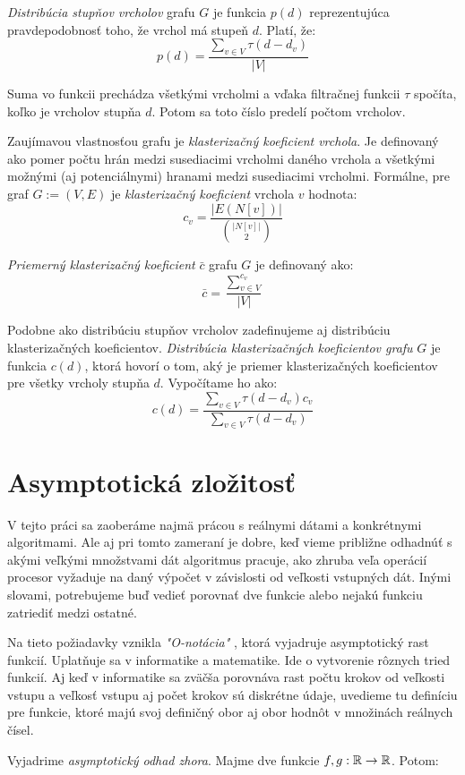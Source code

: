 \emph{Distribúcia stupňov vrcholov} grafu $G$ je funkcia 
$p(d)$ reprezentujúca pravdepodobnosť toho, že vrchol má stupeň $d$. Platí, že: 
$$p(d) = \frac{\sum_{v \in V}^{}{\tau(d - d_v)}}{|V|}$$

Suma vo funkcii prechádza všetkými vrcholmi a vďaka filtračnej funkcii $\tau$ 
spočíta, koľko je vrcholov stupňa $d$. Potom sa toto číslo predelí počtom vrcholov.

Zaujímavou vlastnosťou grafu je \emph{klasterizačný koeficient vrchola}. Je 
definovaný ako pomer počtu hrán medzi susediacimi vrcholmi daného vrchola a 
všetkými možnými (aj potenciálnymi) hranami medzi susediacimi vrcholmi. 
Formálne, pre graf $G := (V, E)$ je \emph{klasterizačný koeficient} vrchola 
$v$ hodnota: $$c_v = \frac{|E(N[v])|}{\binom{|N[v]|}{2}}$$

\emph{Priemerný klasterizačný koeficient} $\bar{c}$ grafu $G$ je definovaný ako:
$$\bar{c} = \frac{\sum_{v\in V}^{c_v}}{|V|}$$

Podobne ako distribúciu stupňov vrcholov zadefinujeme aj distribúciu 
klasterizačných koeficientov. \emph{Distribúcia klasterizačných koeficientov 
grafu} $G$ je funkcia $c(d)$, ktorá hovorí o tom, aký je priemer
klasterizačných koeficientov pre všetky vrcholy stupňa $d$. Vypočítame ho ako: 
$$c(d) = \frac{\sum_{v \in V}^{}{\tau(d - d_v)c_v}}
{\sum_{v \in V}^{}{\tau(d - d_v)}}$$

\section{Asymptotická zložitosť}

V tejto práci sa zaoberáme najmä prácou s reálnymi dátami a konkrétnymi 
algoritmami. Ale aj pri tomto zameraní je dobre, keď vieme približne odhadnúť 
s akými veľkými množstvami dát algoritmus pracuje, ako zhruba veľa operácií 
procesor vyžaduje na daný výpočet v závislosti od veľkosti vstupných dát. Inými 
slovami, potrebujeme buď vedieť porovnať dve funkcie alebo nejakú funkciu 
zatriediť medzi ostatné. 

Na tieto požiadavky vznikla \emph{"O-notácia"} \citep{onot}, ktorá vyjadruje 
asymptotický rast funkcií. Uplatňuje sa v informatike a matematike. 
Ide o vytvorenie rôznych tried funkcií. Aj keď v informatike sa zväčša 
porovnáva rast počtu krokov od veľkosti vstupu a veľkosť vstupu aj počet krokov 
sú diskrétne údaje, uvedieme tu definíciu pre funkcie, ktoré majú svoj 
definičný obor aj obor hodnôt v množinách reálnych čísel.

Vyjadrime \emph{asymptotický odhad zhora}. 
Majme dve funkcie $f, g: \mathbb{R} \rightarrow \mathbb{R}$. Potom:

